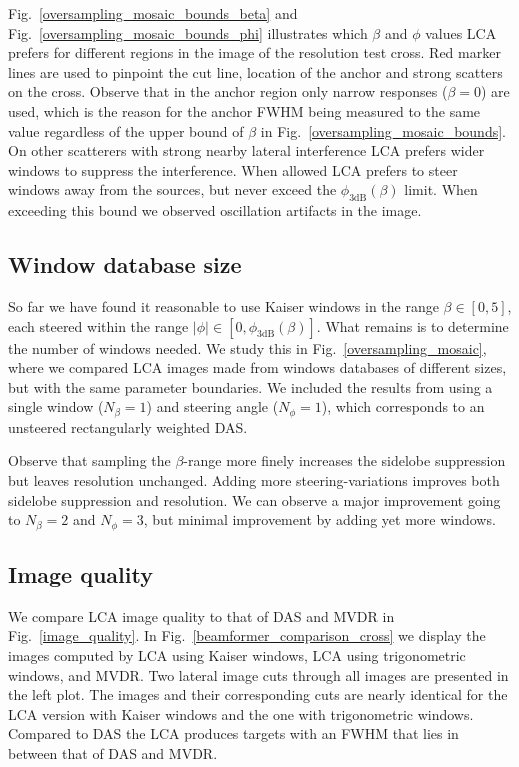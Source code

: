 \documentclass[10pt,journal,draftclsnofoot,onecolumn]{IEEEtran}
\newcommand\Fig[1]{Fig.~\ref{#1}}
\newcommand\1{\vec 1}
\begin{document}
\Fig{oversampling_mosaic_bounds_beta} and \Fig{oversampling_mosaic_bounds_phi} illustrates which $\beta$ and $\phi$ values LCA prefers for different regions in the image of the resolution test cross. Red marker lines are used to pinpoint the cut line, location of the anchor and strong scatters on the cross. Observe that in the anchor region only narrow responses ($\beta=0$) are used, which is the reason for the anchor FWHM being measured to the same value regardless of the upper bound of $\beta$ in \Fig{oversampling_mosaic_bounds}. On other scatterers with strong nearby lateral interference LCA prefers wider windows to suppress the interference. When allowed LCA prefers to steer windows away from the sources, but never exceed the $\phi_\text{3dB}(\beta)$ limit. When exceeding this bound we observed oscillation artifacts in the image.


\subsection{Window database size}\label{sec:results_database_size}

So far we have found it reasonable to use Kaiser windows in the range $\beta\in[0,5]$, each steered within the range $|\phi|\in[0,\phi_\mathrm{3dB}(\beta)]$. What remains is to determine the number of windows needed. We study this in \Fig{oversampling_mosaic}, where we compared LCA images made from windows databases of different sizes, but with the same parameter boundaries. We included the results from using a single window ($N_\beta=1$) and steering angle ($N_\phi=1$), which corresponds to an unsteered rectangularly weighted DAS.

Observe that sampling the $\beta$-range more finely increases the sidelobe suppression but leaves resolution unchanged. Adding more steering-variations improves both sidelobe suppression and resolution. We can observe a major improvement going to $N_\beta=2$ and $N_\phi=3$, but minimal improvement by adding yet more windows.


\subsection{Image quality}\label{sec:results_image_quality}

We compare LCA image quality to that of DAS and MVDR in \Fig{image_quality}. In \Fig{beamformer_comparison_cross} we display the images computed by LCA using Kaiser windows, LCA using trigonometric windows, and MVDR. Two lateral image cuts through all images are presented in the left plot. The images and their corresponding cuts are nearly identical for the LCA version with Kaiser windows and the one with trigonometric windows. Compared to DAS the LCA produces targets with an FWHM that lies in between that of DAS and MVDR.
\end{document}
